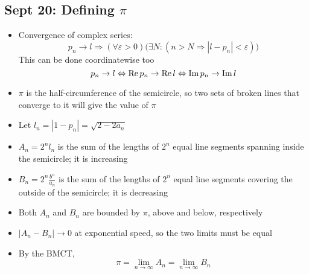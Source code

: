 \documentclass[10pt, oneside]{article}
\newcommand{\lti}[1]{\lim_{#1 \rightarrow \infty}}
\begin{document}
\subsection{Sept 20: Defining $\pi$}
\begin{itemize}
    \item Convergence of complex series:
        \[p_n \rightarrow l \Rightarrow (\forall \varepsilon > 0) \big( \exists N : ( n > N \Rightarrow |l - p_n| < \varepsilon ) \big)\]
    This can be done coordinatewise too
        \[p_n \rightarrow l \Leftrightarrow {\rm Re} \, p_n \rightarrow {\rm Re} \, l \Leftrightarrow {\rm Im} \, p_n \rightarrow {\rm Im} \, l\]
    \item $\pi$ is the half-circumference of the semicircle, so two sets of broken lines that converge to it will give the value of $\pi$
    \item Let $l_n = |1-p_n| = \sqrt{2 - 2a_n}$
    \item $A_n = 2^n l_n$ is the sum of the lengths of $2^n$ equal line segments spanning inside the semicircle; it is increasing
    \item $B_n = 2^n \frac{b^n}{a_n}$ is the sum of the lengths of $2^n$ equal line segments covering the outside of the semicircle; it is decreasing
    \item Both $A_n$ and $B_n$ are bounded by $\pi$, above and below, respectively
    \item $|A_n - B_n| \rightarrow 0$ at exponential speed, so the two limits must be equal
    \item By the BMCT, 
        \[\pi = \lti{n} A_n = \lti{n} B_n\]
\end{itemize}
\end{document}
